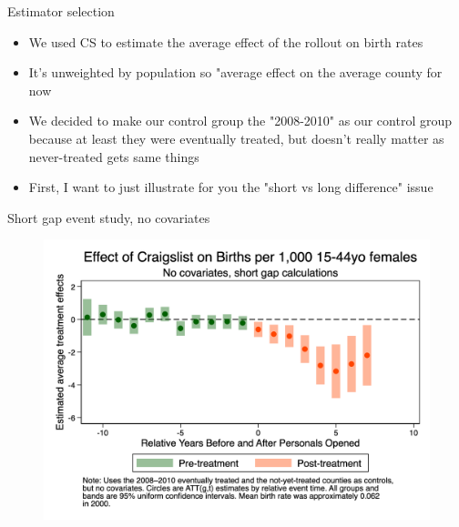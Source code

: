 \documentclass{beamer}
\begin{document}
\begin{frame}{Estimator selection}

\begin{itemize}

\item We used CS to estimate the average effect of the rollout on birth rates 
\item It's unweighted by population so "average effect on the average county for now
\item We decided to make our control group the "2008-2010" as our control group because at least they were eventually treated, but doesn't really matter as never-treated gets same things
\item First, I want to just illustrate for you the "short vs long difference" issue

\end{itemize}

\end{frame}





\begin{frame}{Short gap event study, no covariates}

\begin{figure}
    \centering
    \includegraphics[height=0.85\textheight]{./lecture_includes/es_births_shortnone.png}
\end{figure}

\end{frame}
\end{document}
